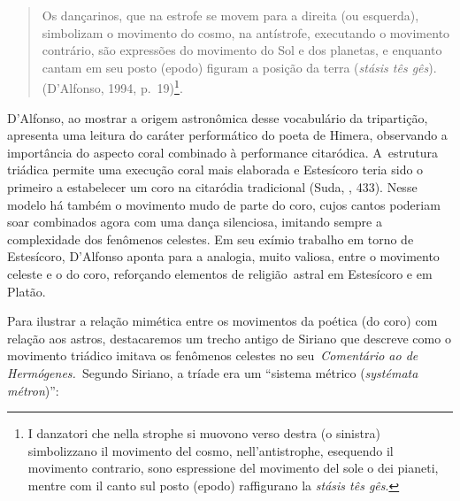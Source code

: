  

\begin{quote}
Os dançarinos, que na estrofe se movem para a direita (ou esquerda),
simbolizam o movimento do cosmo, na antístrofe, executando o movimento
contrário, são expressões do movimento do Sol e dos planetas, e enquanto
cantam em seu posto (epodo) figuram a posição da terra (\emph{stásis tês
gês}). (D'Alfonso, 1994, p.~19)\footnote{I danzatori che nella strophe si
  muovono verso destra (o sinistra) simbolizzano il movimento del cosmo,
  nell'antistrophe, esequendo il movimento contrario, sono espressione
  del movimento del sole o dei pianeti, mentre com il canto sul posto
  (epodo) raffigurano la \emph{stásis tês gês}.}.
\end{quote}

 

D'Alfonso, ao mostrar a origem astronômica desse vocabulário da
tripartição, apresenta uma leitura do caráter performático do poeta de
Himera, observando a importância do aspecto coral combinado à
performance citaródica. A~estrutura triádica permite uma execução coral
mais elaborada e Estesícoro teria sido o primeiro a estabelecer um coro
na citaródia tradicional (Suda, , 433). Nesse modelo há também o
movimento mudo de parte do coro, cujos cantos poderiam soar combinados
agora com uma dança silenciosa, imitando sempre a complexidade dos
fenômenos celestes. Em seu exímio trabalho em torno de Estesícoro,
D'Alfonso aponta para a analogia, muito valiosa, entre o movimento
celeste e o do coro, reforçando elementos de religião~astral em
Estesícoro e em Platão.

Para ilustrar a relação mimética entre os movimentos da poética (do
coro) com relação aos astros, destacaremos um trecho antigo de Siriano
que descreve como o movimento triádico imitava os fenômenos celestes no
seu~\emph{Comentário ao de Hermógenes.~}Segundo Siriano, a tríade era um
``sistema métrico (\emph{systémata métron})'':

 

